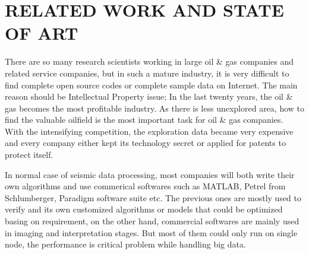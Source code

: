 %
%
%

\chapter{\uppercase{Related Work and State of Art}}

There are so many research scientists working in large oil \& gas companies and related service companies, but in such a mature industry, it is very difficult to find complete open source codes or complete sample data on Internet. The main reason should be Intellectual Property issue; In the last twenty years, the oil \& gas becomes the most profitable industry. As there is less unexplored area, how to find the valuable oilfield is the most important task for oil \& gas companies. With the intensifying competition, the exploration data became very expensive and every company either kept its technology secret or applied for patents to protect itself.    

In normal case of seismic data processing, most companies will both write their own algorithms and use commerical softwares such as MATLAB, Petrel from Schlumberger, Paradigm software suite etc. The previous ones are mostly used to verify and its own customized algorithms or models that could be optimized basing on requirement, on the other hand, commercial softwares are mainly used in imaging and interpretation stages. But most of them could only run on single node, the performance is critical problem while handling big data.  

